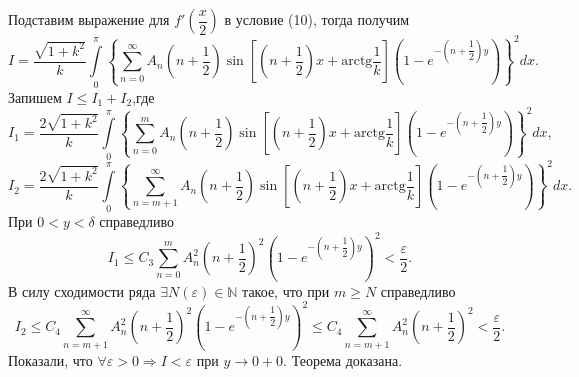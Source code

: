 \documentclass[9pt]{article}
\begin{document}
	Подставим выражение для $f'(\dfrac{x}{2})$ в условие (10), тогда получим
	$$
	I = \dfrac{\sqrt{1+k^2}}{k} \int\limits_0^\pi \left\{\sum\limits_{n=0}^{\infty} A_n \left(n + \dfrac12 \right) \sin{\left[\left(n+\dfrac12\right)x + \mathrm{arctg}\dfrac{1}{k}\right] }  \left(1 - e^{-\left(n+\dfrac12 \right)y}\right)\right\}^2 dx.
	$$
	Запишем $I \leq I_1 + I_2$,где 
	$$
	I_1 = \dfrac{2\sqrt{1+k^2}}{k} \int\limits_0^\pi \left\{\sum\limits_{n=0}^{m} A_n \left(n + \dfrac12 \right) \sin{\left[\left(n+\dfrac12\right)x + \mathrm{arctg}\dfrac{1}{k}\right] }  \left(1 - e^{-\left(n+\dfrac12 \right)y}\right)\right\}^2 dx,
	$$
	$$
	I_2 = \dfrac{2\sqrt{1+k^2}}{k} \int\limits_0^\pi \left\{\sum\limits_{n=m+1}^{\infty} A_n \left(n + \dfrac12 \right) \sin{\left[\left(n+\dfrac12\right)x + \mathrm{arctg}\dfrac{1}{k}\right] }  \left(1 - e^{-\left(n+\dfrac12 \right)y}\right)\right\}^2 dx.
	$$
	При $0 < y < \delta$ справедливо
	$$
	I_1 \leq C_3 \sum\limits_{n=0}^{m} A_n^2 \left(n+\dfrac12\right)^2 \left(1 - e^{-\left(n+\dfrac12\right)y}\right)^2 < \dfrac{\varepsilon}{2}.
	$$
	В силу сходимости ряда $\exists N(\varepsilon) \in \mathbb{N}$ такое, что при $m \geq N$ справедливо
	$$
	I_2 \leq C_4 \sum\limits_{n=m+1}^{\infty} A_n^2 \left(n+\dfrac12\right)^2 \left(1 - e^{-\left(n+\dfrac12\right)y}\right)^2  \leq C_4 \sum\limits_{n=m+1}^{\infty} A_n^2 \left(n+\dfrac12\right)^2 < \dfrac{\varepsilon}{2}.
	$$
	Показали, что $\forall \varepsilon > 0 \Rightarrow I < \varepsilon$ при $y \to 0+0$. Теорема доказана.
	
\end{document}
